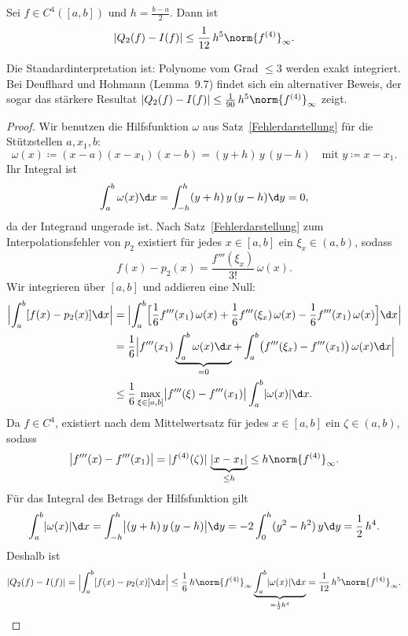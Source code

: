 \documentclass[11pt]{article}
\begin{document}
\begin{theorem}\Theorem
  Sei $f \in C^4([a, b])$ und $h = \frac{b - a}{2}$. Dann ist
  \[ \lvert Q_2(f) - I(f) \rvert \le \frac{1}{12}\, h^5 \norm{f^{(4)}}_\infty. \]
\end{theorem}


\begin{note}
  Die Standardinterpretation ist: Polynome vom Grad $\le 3$ werden exakt integriert. Bei Deuflhard und Hohmann (Lemma~9.7) findet sich ein alternativer Beweis, der sogar das stärkere Resultat $\lvert Q_2(f) - I(f) \rvert \le \frac{1}{90}\, h^5 \norm{f^{(4)}}_\infty$ zeigt.
\end{note}


\begin{proof}
  Wir benutzen die Hilfsfunktion $\omega$ aus Satz~\ref{Fehlerdarstellung} für die Stützstellen $a, x_1, b$:
  \[ \omega(x) \coloneqq (x - a)(x - x_1)(x - b) = (y + h)\, y\, (y - h) \quad \text{mit } y \coloneqq x - x_1. \]
  Ihr Integral ist
  \[ \int_a^b \omega(x) \d x = \int_{-h}^{h} (y + h)\, y\, (y - h) \d y = 0, \]
  da der Integrand ungerade ist. Nach Satz~\ref{Fehlerdarstellung} zum Interpolationsfehler von $p_2$ existiert für jedes $x \in [a, b]$ ein $\xi_x \in (a, b)$, sodass
  \[ f(x) - p_2(x) = \frac{f'''(\xi_x)}{3!}\, \omega(x). \]
Wir integrieren über $[a, b]$ und addieren eine Null:
  \begin{align*}
    \Bigl\lvert \int_a^b [f(x) - p_2(x)] \d x \Bigr\rvert
    &= \Bigl\lvert \int_a^b \Bigl[\frac{1}{6} f'''(x_1)\, \omega(x) + \frac{1}{6} f'''(\xi_x)\, \omega(x) - \frac{1}{6} f'''(x_1)\, \omega(x)\Bigr] \d x \Bigr\rvert \\
    &= \frac{1}{6} \Bigl\lvert f'''(x_1) \underbrace{\int_a^b \omega(x) \d x}_{= 0} + \int_a^b \bigl(f'''(\xi_x) - f'''(x_1)\bigr)\, \omega(x) \d x \Bigr\rvert \\
    &\le \frac{1}{6} \max_{\xi \in [a, b]} \bigl\lvert f'''(\xi) - f'''(x_1) \bigr\rvert \int_a^b \lvert \omega(x) \rvert \d x.
  \end{align*}
Da $f \in C^4$, existiert nach dem Mittelwertsatz für jedes $x \in [a, b]$ ein $\zeta \in (a, b)$, sodass
  \[ \bigl\lvert f'''(x) - f'''(x_1) \bigr\rvert = \lvert f^{(4)}(\zeta) \rvert\, \underbrace{\lvert x - x_1 \rvert}_{\le h} \le h \norm{f^{(4)}}_\infty. \]
  Für das Integral des Betrags der Hilfsfunktion gilt
  \[ \int_a^b \lvert \omega(x) \rvert \d x = \int_{-h}^{h} \bigl\lvert (y + h)\, y\, (y - h) \bigr\rvert \d y = -2 \int_0^h (y^2 - h^2)\, y \d y = \frac{1}{2}\, h^4. \]
  Deshalb ist
  \[
    \lvert Q_2(f) - I(f) \rvert = \Bigl\lvert \int_a^b [f(x) - p_2(x)] \d x \Bigr\rvert
    \le \frac{1}{6}\, h \norm{f^{(4)}}_\infty \underbrace{\int_a^b \lvert \omega(x) \rvert \d x}_{= \frac{1}{2} h^4}
    = \frac{1}{12}\, h^5 \norm{f^{(4)}}_\infty. \qedhere
  \]
\end{proof}
\end{document}

